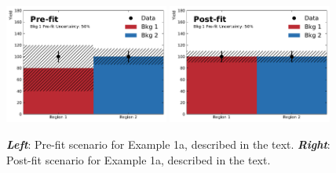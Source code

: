 \begin{figure}[!htb]
    \begin{center}
        \includegraphics[width=0.48\textwidth]{figures/common_ana/stat_hypo/profile_examples/profile_ex_1_NP50_pre}
        \includegraphics[width=0.48\textwidth]{figures/common_ana/stat_hypo/profile_examples/profile_ex_1_NP50_post}
        \caption{
            \textbf{\textit{Left}}: Pre-fit scenario for Example 1a, described in the text.
            \textbf{\textit{Right}}: Post-fit scenario for Example 1a, described in the text.
        }
        \label{fig:prof_ex_1_np50}
    \end{center}
\end{figure}

